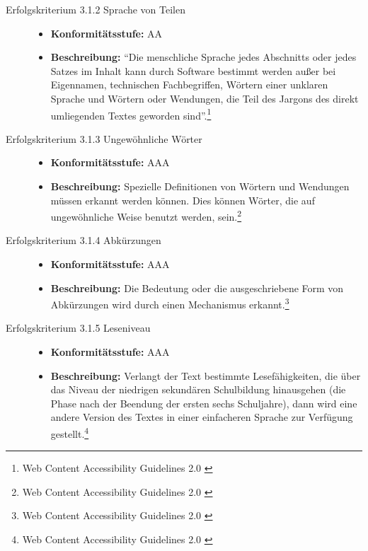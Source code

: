 \begin{description}
\begin{description}
		\item[Erfolgskriterium 3.1.2 Sprache von Teilen]\hfill
		\begin{itemize}
			\item \textbf{Konformitätsstufe:} AA
			\item \textbf{Beschreibung:} "`Die menschliche Sprache jedes Abschnitts oder jedes Satzes im Inhalt kann durch Software bestimmt werden außer
			bei Eigennamen, technischen Fachbegriffen, Wörtern einer unklaren Sprache und Wörtern oder Wendungen, die Teil des Jargons des direkt 
			umliegenden Textes geworden sind"'.\footnote{Web Content Accessibility Guidelines 2.0 \cite{WCAG2.0}}
		\end{itemize}
		
		\item[Erfolgskriterium 3.1.3 Ungewöhnliche Wörter]\hfill
		\begin{itemize}
			\item \textbf{Konformitätsstufe:} AAA
			\item \textbf{Beschreibung:} Spezielle Definitionen von Wörtern und Wendungen müssen erkannt werden können. Dies können Wörter, die auf ungewöhnliche 
			Weise benutzt werden, sein.\footnote{Web Content Accessibility Guidelines 2.0 \cite{WCAG2.0}}
		\end{itemize}
		
		\item[Erfolgskriterium 3.1.4 Abkürzungen]\hfill
		\begin{itemize}
			\item \textbf{Konformitätsstufe:} AAA
			\item \textbf{Beschreibung:} Die Bedeutung oder die ausgeschriebene Form von Abkürzungen wird durch einen Mechanismus 
			erkannt.\footnote{Web Content Accessibility Guidelines 2.0 \cite{WCAG2.0}}
		\end{itemize}
		
		\item[Erfolgskriterium 3.1.5 Leseniveau]\hfill
		\begin{itemize}
			\item \textbf{Konformitätsstufe:} AAA
			\item \textbf{Beschreibung:} Verlangt der Text bestimmte Lesefähigkeiten, die über das Niveau der niedrigen sekundären Schulbildung hinausgehen (die 
			Phase nach der Beendung der ersten sechs Schuljahre), dann wird eine andere Version des Textes in einer einfacheren Sprache zur Verfügung 
			gestellt.\footnote{Web Content Accessibility Guidelines 2.0 \cite{WCAG2.0}}
		\end{itemize}
		

\end{description}
\end{description}
